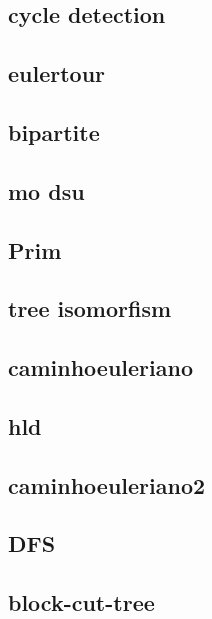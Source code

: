 \subsection{cycle detection}
\raggedbottom
\hrulefill
\subsection{eulertour}
\raggedbottom
\hrulefill
\subsection{bipartite}
\raggedbottom
\hrulefill
\subsection{mo dsu}
\raggedbottom
\hrulefill
\subsection{Prim}
\raggedbottom
\hrulefill
\subsection{tree isomorfism}
\raggedbottom
\hrulefill
\subsection{caminhoeuleriano}
\raggedbottom
\hrulefill
\subsection{hld}
\raggedbottom
\hrulefill
\subsection{caminhoeuleriano2}
\raggedbottom
\hrulefill
\subsection{DFS}
\raggedbottom
\hrulefill
\subsection{block-cut-tree}
\raggedbottom
\hrulefill
